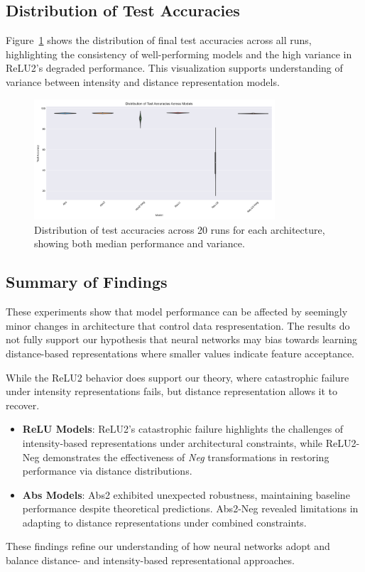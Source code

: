 \subsection{Distribution of Test Accuracies}
Figure~\ref{fig:test_dist} shows the distribution of final test accuracies across all runs, highlighting the consistency of well-performing models and the high variance in ReLU2's degraded performance. This visualization supports understanding of variance between intensity and distance representation models.

\begin{figure}[ht]
\centering
\includegraphics[width=0.8\textwidth]{images/accuracy_distribution.png}
\caption{Distribution of test accuracies across 20 runs for each architecture, showing both median performance and variance.}
\label{fig:test_dist}
\end{figure}

\subsection{Summary of Findings}

These experiments show that model performance can be affected by seemingly minor changes in architecture that control data respresentation. The results do not fully support our hypothesis that neural networks may bias towards learning distance-based representations where smaller values indicate feature acceptance.

While the ReLU2 behavior does support our theory, where catastrophic failure under intensity representations fails, but distance representation allows it to recover.

\begin{itemize}
    \item \textbf{ReLU Models}: ReLU2's catastrophic failure highlights the challenges of intensity-based representations under architectural constraints, while ReLU2-Neg demonstrates the effectiveness of \textit{Neg} transformations in restoring performance via distance distributions.
    \item \textbf{Abs Models}: Abs2 exhibited unexpected robustness, maintaining baseline performance despite theoretical predictions. Abs2-Neg revealed limitations in adapting to distance representations under combined constraints.
\end{itemize}
These findings refine our understanding of how neural networks adopt and balance distance- and intensity-based representational approaches.